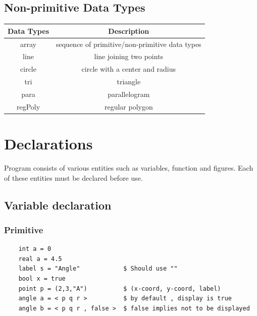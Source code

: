 \documentclass[12pt]{article}
\begin{document}
\subsection{Non-primitive Data Types}

\begin{center}
\begin{tabular}{ | c | c |} 
  \hline
  Data Types & Description \\ 
  \hline
  array & sequence of primitive/non-primitive data types  \\
line & line joining two points \\
circle & circle with a center and radius \\
tri & triangle  \\
para & parallelogram  \\
regPoly & regular polygon \\
\hline
\end{tabular}
\end{center}


\section{Declarations}
Program consists of various entities such as variables, function and figures. Each of these entities must be declared before use.

\subsection{Variable declaration}
\subsubsection{Primitive}
\begin{verbatim}
    int a = 0
    real a = 4.5
    label s = "Angle"            $ Should use ""
    bool x = true
    point p = (2,3,"A")          $ (x-coord, y-coord, label) 
    angle a = < p q r >          $ by default , display is true 
    angle b = < p q r , false >  $ false implies not to be displayed 
\end{verbatim}
\end{document}
